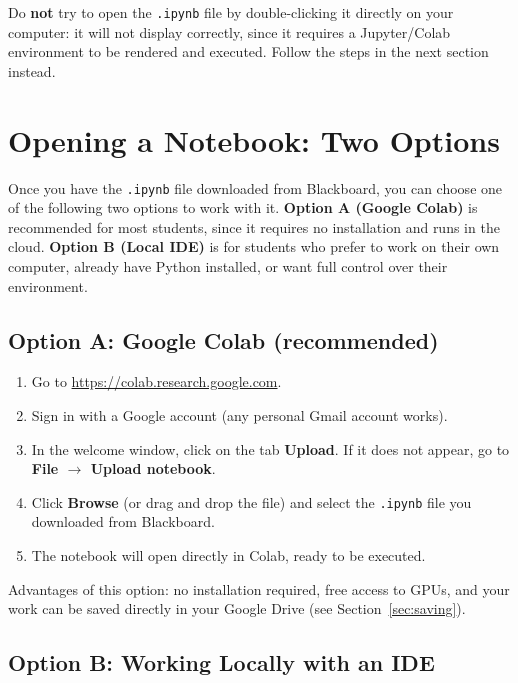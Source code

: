 \documentclass[11pt,a4paper]{article}
\begin{document}
\begin{warnbox}[Important]
Do \textbf{not} try to open the \texttt{.ipynb} file by double-clicking it directly on your computer: it will not display correctly, since it requires a Jupyter/Colab environment to be rendered and executed. Follow the steps in the next section instead.
\end{warnbox}

\section{Opening a Notebook: Two Options}

Once you have the \texttt{.ipynb} file downloaded from Blackboard, you can choose one of the following two options to work with it. \textbf{Option A (Google Colab)} is recommended for most students, since it requires no installation and runs in the cloud. \textbf{Option B (Local IDE)} is for students who prefer to work on their own computer, already have Python installed, or want full control over their environment.

\subsection{Option A: Google Colab (recommended)}

\begin{infobox}
\begin{enumerate}
    \item Go to \url{https://colab.research.google.com}.
    \item Sign in with a Google account (any personal Gmail account works).
    \item In the welcome window, click on the tab \textbf{Upload}. If it does not appear, go to \textbf{File $\rightarrow$ Upload notebook}.
    \item Click \textbf{Browse} (or drag and drop the file) and select the \texttt{.ipynb} file you downloaded from Blackboard.
    \item The notebook will open directly in Colab, ready to be executed.
\end{enumerate}
\end{infobox}

Advantages of this option: no installation required, free access to GPUs, and your work can be saved directly in your Google Drive (see Section~\ref{sec:saving}).

\subsection{Option B: Working Locally with an IDE}
\end{document}
